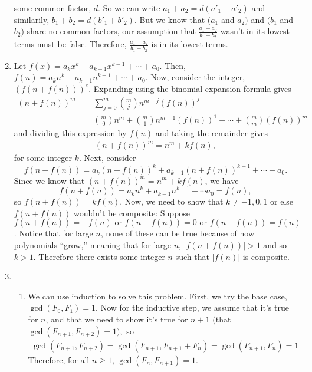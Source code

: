 \documentclass[12pt]{article}
\begin{document}
\begin{enumerate}
    some common factor, $d$. So we can write $a_1 + a_2 = d(a'_1 + a'_2)$ and 
    similarily, $b_1 + b_2 = d(b'_1 + b'_2)$. But we know that $(a_1$ and $a_2)$ and 
    $(b_1 $ and $b_2)$ share no common factors, our assumption that $\frac{a_1+a_2}{b_1+b_2}$
    wasn't in its lowest terms must be false. Therefore, $\frac{a_1+a_2}{b_1+b_2}$ is in its 
    lowest terms.
    \item Let $f(x) = a_kx^k + a_{k-1}x^{k-1} + \cdots  + a_0$. Then, 
    $f(n) = a_kn^k + a_{k-1}n^{k-1} + \cdots  + a_0$. Now, consider the integer, 
    $(f(n + f(n)))^e$. Expanding using the binomial expansion formula gives 
    \begin{align*}
        (n + f(n))^m &= \sum_{j=0}^{m} {m \choose j}n^{m-j}(f(n))^j \\
        &= {m\choose0} n^m + {m\choose1}n^{m-1}(f(n))^1 + \cdots + {m\choose{m}}(f(n))^m
    \end{align*}
    and dividing this expression by $f(n)$ and taking the remainder gives 
    \begin{align*}
        (n+f(n))^m = n^m + kf(n),
    \end{align*}
    for some integer $k$. Next, consider 
    \[f(n + f(n)) = a_k(n+f(n))^k + a_{k-1}(n+f(n))^{k-1} + \cdots  + a_0.\]
    Since we know that $(n+f(n))^m = n^m + kf(n)$, we have 
    \[f(n+f(n)) = a_kn^k + a_{k-1}n^{k-1} + \cdots a_0  = f(n),\] so 
    $f(n+f(n)) = kf(n)$. Now, we need to show that $k \neq -1,0,1$ or else 
    $f(n+f(n))$ wouldn't be composite: Suppose 
    \[f(n+f(n)) = -f(n) \text{ or } f(n+f(n)) = 0 \text{ or } f(n+f(n)) = f(n)\].
    Notice that for large $n$, none of these can be true because of how polynomials 
    ``grow,'' meaning that for large $n$, $|f(n+f(n))| > 1$ and so $k >1$. Therefore there exists 
    some integer $n$ such that $|f(n)|$ is composite. 
    \item
    \begin{enumerate}
        \item We can use induction to solve this problem. First, we try the base 
        case, $\gcd(F_0, F_1) = 1$. Now for the inductive step, we assume that it's 
        true for $n$, and that we need to show it's true for $n+1$ (that $\gcd(F_{n+1},
        F_{n+2}) = 1),$ so 
        \begin{align*}
            \gcd(F_{n+1}, F_{n+2}) = \gcd(F_{n+1}, F_{n+1} + F_{n}) = \gcd(F_{n+1},F_n) = 1
        \end{align*}
        Therefore, for all $n \geq 1$, $\gcd(F_n, F_{n+1}) = 1$. 

\end{enumerate}
\end{enumerate}
\end{document}

